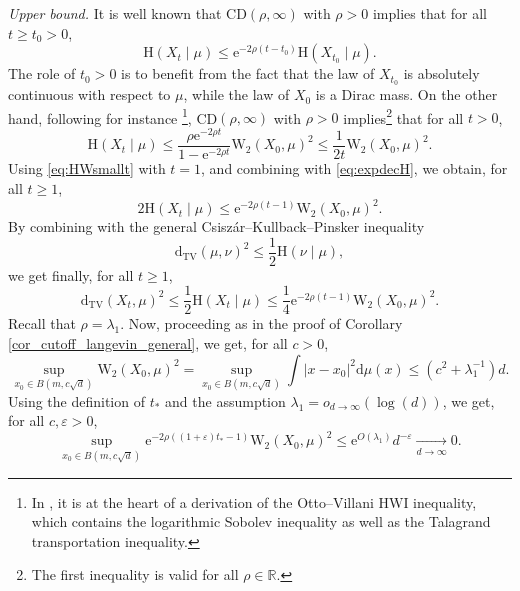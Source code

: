 \documentclass[10pt,reqno]{amsart}
\numberwithin{equation}{section}
\newcommand{\DTV}{\mathrm{d}_{\mathrm{TV}}}
\begin{document}
\emph{Upper bound.} It is well known that CD$(\rho, \infty)$ with $\rho>0$
implies that for all $t \geq t_0>0$,
\begin{equation}\label{eq:expdecH}
  \mathrm{H}(X_t\mid\mu) \leq\mathrm{e}^{-2\rho(t-t_0)}\mathrm{H}(X_{t_0}\mid\mu).
\end{equation}
The role of $t_0>0$ is to benefit from the fact that the law of $X_{t_0}$ is
absolutely continuous with respect to $\mu$, while the law of $X_0$ is a Dirac
mass. On the other hand, following for instance
\cite[Lem.~4.2]{BGL01}\footnote{In \cite{BGL01}, it is at the heart of a
  derivation of the Otto--Villani $\mathrm{H}\mathrm{W}\mathrm{I}$
  inequality, which contains the logarithmic Sobolev inequality as well as the
  Talagrand transportation inequality.}, CD$(\rho, \infty)$ with $\rho>0$
implies\footnote{The first inequality is valid for all $\rho\in\mathbb{R}$.}
that for all $t > 0$,
\begin{equation}\label{eq:HWsmallt}
  \mathrm{H}(X_t\mid\mu) \leq \frac{\rho\mathrm{e}^{-2\rho t}}{1-\mathrm{e}^{-2\rho t}}\mathrm{W}_2(X_0, \mu)^2
  \leq\frac{1}{2t}\mathrm{W}_2(X_0, \mu)^2.
\end{equation}
Using \eqref{eq:HWsmallt} with $t=1$, and combining with \eqref{eq:expdecH}, we obtain, for all $t\geq1$,
\begin{equation}\label{eq:HtWX0}
  2\mathrm{H}(X_t\mid\mu) \leq \mathrm{e}^{-2\rho(t-1)}\mathrm{W}_2(X_0, \mu)^2.
\end{equation}
By combining with the general Csiszár--Kullback--Pinsker inequality
\begin{equation}\label{eq:CKP}
  \DTV(\mu,\nu)^2\leq\frac{1}{2}\mathrm{H}(\nu\mid\mu),
\end{equation}
we get finally, for all $t\geq1$,
\begin{equation}
  \DTV(X_t,\mu)^2\leq\frac{1}{2}\mathrm{H}(X_t\mid\mu)
  \leq \frac{1}{4}\mathrm{e}^{-2\rho(t-1)}\mathrm{W}_2(X_0, \mu)^2.
\end{equation}
Recall that $\rho=\lambda_1$. Now, proceeding as in the proof of Corollary
\ref{cor_cutoff_langevin_general}, we get, for all $c>0$,
\begin{equation}\label{eq:WX0upper}
  \sup_{x_0\in B(m,c\sqrt{d})}\mathrm{W}_2(X_0,\mu)^2=\sup_{x_0\in B(m,c\sqrt{d})}\int|x-x_0|^2\mathrm{d}\mu(x)
  \leq(c^2+\lambda_1^{-1})d.
\end{equation}
Using the definition of $t_*$ and the assumption
$\lambda_1=o_{d\to\infty}(\log(d))$, we get, for all $c,\varepsilon>0$,
\begin{equation}
  \sup_{x_0\in B(m,c\sqrt{d})}\mathrm{e}^{-2\rho((1+\varepsilon)t_*-1)}\mathrm{W}_2(X_0, \mu)^2
  \leq\mathrm{e}^{O(\lambda_1)}d^{-\varepsilon}\xrightarrow[d\to\infty]{}0.
\end{equation}
\end{document}
